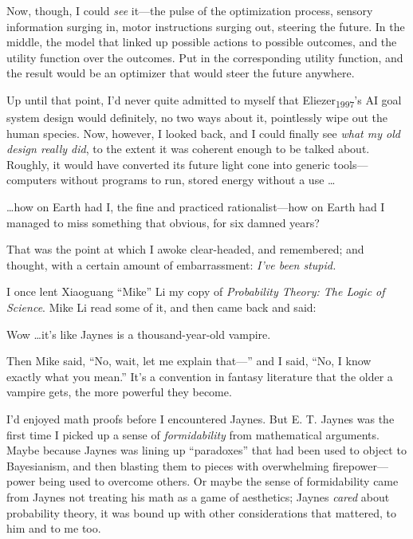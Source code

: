 {
 Now, though, I could \textit{see} it---the pulse of the
optimization process, sensory information surging in, motor
instructions surging out, steering the future. In the middle, the model
that linked up possible actions to possible outcomes, and the utility
function over the outcomes. Put in the corresponding utility function,
and the result would be an optimizer that would steer the future
anywhere.}

{
 Up until that point, I'd never quite admitted to
myself that Eliezer\textsubscript{1997}'s AI goal
system design would definitely, no two ways about it, pointlessly wipe
out the human species. Now, however, I looked back, and I could finally
see \textit{what my old design really did}, to the extent it was
coherent enough to be talked about. Roughly, it would have converted
its future light cone into generic tools---computers without programs
to run, stored energy without a use \ldots}

{
 \ldots how on Earth had I, the fine and practiced rationalist---how
on Earth had I managed to miss something that obvious, for six damned
years?}

{
 That was the point at which I awoke clear-headed, and remembered;
and thought, with a certain amount of embarrassment:
\textit{I've been stupid.}}

\myendsectiontext


\bigskip


{
 I once lent Xiaoguang ``Mike''
Li my copy of \textit{Probability Theory: The Logic of Science}. Mike
Li read some of it, and then came back and said:}

{
 Wow \ldots it's like Jaynes is a thousand-year-old
vampire.}

{
 Then Mike said, ``No, wait, let me explain
that---'' and I said, ``No, I know
exactly what you mean.'' It's a
convention in fantasy literature that the older a vampire gets, the
more powerful they become.}

{
 I'd enjoyed math proofs before I encountered
Jaynes. But E. T. Jaynes was the first time I picked up a sense of
\textit{formidability} from mathematical arguments. Maybe because
Jaynes was lining up ``paradoxes''
that had been used to object to Bayesianism, and then blasting them to
pieces with overwhelming firepower---power being used to overcome
others. Or maybe the sense of formidability came from Jaynes not
treating his math as a game of aesthetics; Jaynes \textit{cared} about
probability theory, it was bound up with other considerations that
mattered, to him and to me too.}

